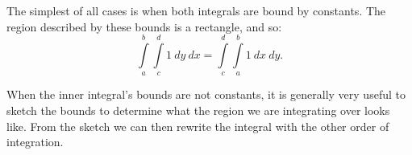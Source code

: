 	\checkoddpage
{}

The simplest of all cases is when both integrals are bound by constants. The region described by these bounds is a rectangle, and so:
$$\int\limits_a^b\int\limits_c^d 1\ dy\ dx = \int\limits_c^d\int\limits_a^b1\ dx\ dy.$$

When the inner integral's bounds are not constants, it is generally very useful to sketch the bounds to determine what the region we are integrating over looks like. From the sketch we can then rewrite the integral with the other order of integration.

